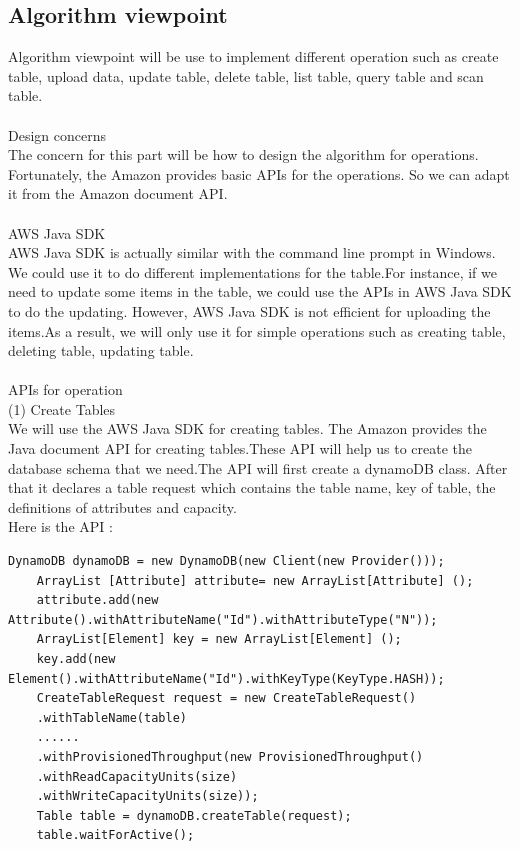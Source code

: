     \subsection{Algorithm viewpoint}
    Algorithm viewpoint will be use to implement different operation such as create table, upload data, update table, delete table, list table, query table and scan table.\\
\\
    Design concerns\\
    The concern for this part will be how to design the algorithm for operations. Fortunately, the Amazon provides basic APIs for the operations. So we can adapt it from the Amazon document API.\\
\\  
    AWS Java SDK\\
    AWS Java SDK is actually similar with the command line prompt in Windows. We could use it to do different implementations for the table.For instance, if we need to update some items in the table, we could use the APIs in AWS Java SDK to do the updating. However, AWS Java SDK is not efficient for uploading the items.As a result, we will only use it for simple operations such as creating table, deleting table, updating table.\\
\\
	APIs for operation\\ 
 	(1) Create Tables\\
    We will use the AWS Java SDK for creating tables. The Amazon provides the Java document API for creating tables.These API will help us to create the database schema that we need.The API will first create a dynamoDB class. After that it declares a table request which contains the table name, key of table, the definitions of attributes and capacity.\\
    Here is the API\cite{w1} :\\
    \begin{lstlisting}[caption=API for create tables]
	DynamoDB dynamoDB = new DynamoDB(new Client(new Provider()));
	ArrayList [Attribute] attribute= new ArrayList[Attribute] ();
	attribute.add(new Attribute().withAttributeName("Id").withAttributeType("N"));
  	ArrayList[Element] key = new ArrayList[Element] ();
 	key.add(new  Element().withAttributeName("Id").withKeyType(KeyType.HASH));
	CreateTableRequest request = new CreateTableRequest()
	.withTableName(table)
	......
	.withProvisionedThroughput(new ProvisionedThroughput()
	.withReadCapacityUnits(size)
	.withWriteCapacityUnits(size));
	Table table = dynamoDB.createTable(request);
	table.waitForActive();
  \end{lstlisting}
